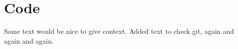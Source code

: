 

\chapter{Code}

Some text would be nice to give context.
Added text to check git, again and again and again.

